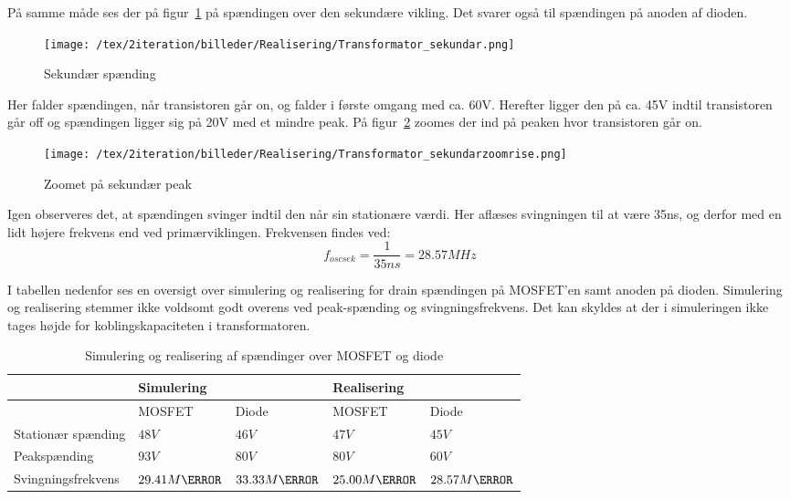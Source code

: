 \noindent På samme måde ses der på figur~\ref{fig:sek} på spændingen over den sekundære vikling. Det svarer også til spændingen på anoden af dioden. 
\begin{figure}[H]
	\center
	\texttt{[image: /tex/2iteration/billeder/Realisering/Transformator\_sekundar.png]}
	\caption{Sekundær spænding}
	\label{fig:sek}
\end{figure}
\noindent Her falder spændingen, når transistoren går on, og falder i første omgang med ca. 60V. Herefter ligger den på ca. 45V indtil transistoren går off og spændingen ligger sig på 20V med et mindre peak. På figur~\ref{fig:sekzoom} zoomes der ind på peaken hvor transistoren går on.
\begin{figure}[H]
	\center
	\texttt{[image: /tex/2iteration/billeder/Realisering/Transformator\_sekundarzoomrise.png]}
	\caption{Zoomet på sekundær peak}
	\label{fig:sekzoom}
\end{figure}
\noindent Igen observeres det, at spændingen svinger indtil den når sin stationære værdi. Her aflæses svingningen til at være 35ns, og derfor med en lidt højere frekvens end ved primærviklingen. Frekvensen findes ved:
\begin{equation} \label{svingsek}
f_{oscsek} = \frac{1}{35ns} = 28.57MHz
\end{equation}

\noindent I tabellen nedenfor ses en oversigt over simulering og realisering for drain spændingen på MOSFET'en samt anoden på dioden. Simulering og realisering stemmer ikke voldsomt godt overens ved peak-spænding og svingningsfrekvens. Det kan skyldes at der i simuleringen ikke tages højde for koblingskapaciteten i transformatoren.

\begin{table}[H] 			
	\centering
	\begin{tabularx}{\textwidth}{|X|l|l|l|l|}
		\hline
		& \multicolumn{2}{|X|}{\textbf{Simulering}} & \multicolumn{2}{|X|}{\textbf{Realisering}} \\ \hline
		& MOSFET & Diode & MOSFET & Diode \\ \hline
		Stationær spænding & $48V$ & $46V$ & $47V$ & $45V$ \\ \hline
		Peakspænding & $93V$ & $80V$ & $80V$ & $60V$ \\ \hline
		Svingningsfrekvens & $29.41M\hertz$ & $33.33M\hertz$ & $25.00M\hertz$ & $28.57M\hertz$ \\ \hline
	\end{tabularx}
	\caption{Simulering og realisering af spændinger over MOSFET og diode}
	\label{tab:MOSDIODE}
\end{table}


